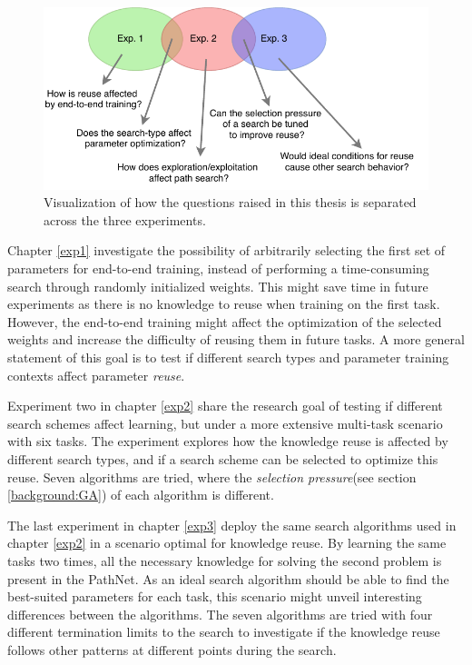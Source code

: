 \begin{figure}[t]
    \includegraphics[width=\textwidth]{Chapters/1.Introduction/figures/All_experiments.pdf}
    \caption[Thesis questions]{Visualization of how the questions raised in this thesis is separated across the three experiments.}
    \label{fig:research_questions}
\end{figure}

Chapter \ref{exp1} investigate the possibility of arbitrarily selecting the first set of parameters for end-to-end training, instead of performing a time-consuming search through randomly initialized weights. This might save time in future experiments as there is no knowledge to reuse when training on the first task. However, the end-to-end training might affect the optimization of the selected weights and increase the difficulty of reusing them in future tasks. A more general statement of this goal is to test if different search types and parameter training contexts affect parameter \textit{reuse}.

Experiment two in chapter \ref{exp2} share the research goal of testing if different search schemes affect learning, but under a more extensive multi-task scenario with six tasks. The experiment explores how the knowledge reuse is affected by different search types, and if a search scheme can be selected to optimize this reuse. Seven algorithms are tried, where the \textit{selection pressure}(see section \ref{background:GA}) of each algorithm is different. 

The last experiment in chapter \ref{exp3} deploy the same search algorithms used in chapter \ref{exp2} in a scenario optimal for knowledge reuse. By learning the same tasks two times, all the necessary knowledge for solving the second problem is present in the PathNet. As an ideal search algorithm should be able to find the best-suited parameters for each task, this scenario might unveil interesting differences between the algorithms. The seven algorithms are tried with four different termination limits to the search to investigate if the knowledge reuse follows other patterns at different points during the search. 


